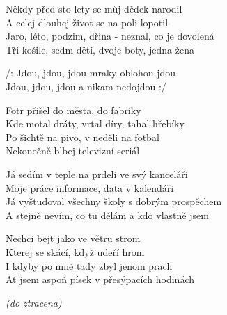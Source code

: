 
\ve{}
Někdy před sto lety se můj dědek narodil\\
A celej dlouhej život se na poli lopotil\\
Jaro, léto, podzim, dřina - neznal, co je dovolená\\
Tři košile, sedm dětí, dvoje boty, jedna žena

\cho{}
/: Jdou, jdou, jdou mraky oblohou jdou\\
Jdou, jdou, jdou a nikam nedojdou :/

\ve{}
Fotr přišel do města, do fabriky\\
Kde motal dráty, vrtal díry, tahal hřebíky\\
Po šichtě na pivo, v neděli na fotbal\\
Nekonečně blbej televizní seriál

\cho{}

\ve{}
Já sedím v teple na prdeli ve svý kanceláři\\
Moje práce informace, data v kalendáři\\
Já vyštudoval všechny školy s dobrým prospěchem\\
A stejně nevím, co tu dělám a kdo vlastně jsem

\cho{}

Nechci bejt jako ve větru strom\\
Kterej se skácí, když udeří hrom\\
I kdyby po mně tady zbyl jenom prach\\
Ať jsem aspoň písek v přesýpacích hodinách

\cho{}
\textit{(do ztracena)}

\esong